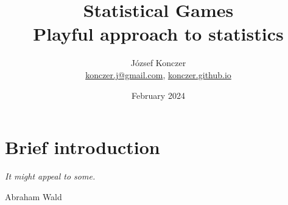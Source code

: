 \documentclass{article}
\title{Statistical Games \\ \large Playful approach to statistics}
\author{József Konczer  \\
        \href{mailto:konczer.j@gmail.com}{konczer.j@gmail.com},
        \href{https://konczer.github.io/}{konczer.github.io}
        }
\date{February 2024}
\theoremstyle{definition}
\begin{document}
\maketitle





\section{Brief introduction}

\epigraph{\textit{It might appeal to some.}}
{Abraham Wald \cite{book:Savage}}
\end{document}
